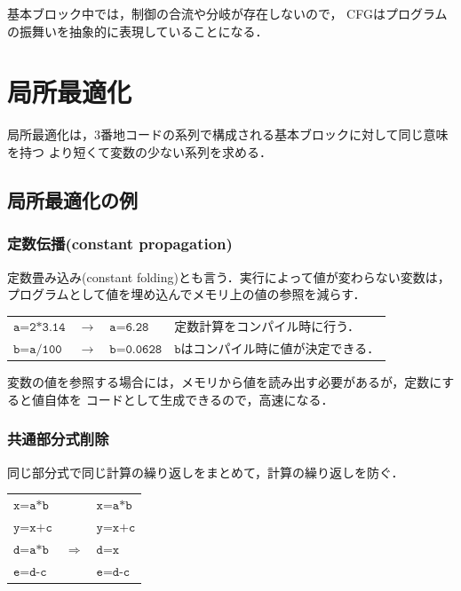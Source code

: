 \documentclass[dvipdfmx,a4j]{jbook}
\begin{document}
基本ブロック中では，制御の合流や分岐が存在しないので，
CFGはプログラムの振舞いを抽象的に表現していることになる．

\section{局所最適化}

局所最適化は，3番地コードの系列で構成される基本ブロックに対して同じ意味を持つ
より短くて変数の少ない系列を求める．

\subsection{局所最適化の例}

\subsubsection{定数伝播(constant propagation)}
定数畳み込み(constant folding)とも言う．実行によって値が変わらない変数は，
プログラムとして値を埋め込んでメモリ上の値の参照を減らす．

\begin{center}
    \begin{tabular}{lclp{6cm}}
        $\texttt{a=2*3.14}$ & $\rightarrow$ & $\texttt{a=6.28}$   & 定数計算をコンパイル時に行う．              \\
        $\texttt{b=a/100}$  & $\rightarrow$ & $\texttt{b=0.0628}$ & $\texttt{b}$はコンパイル時に値が決定できる．
    \end{tabular}
\end{center}

変数の値を参照する場合には，メモリから値を読み出す必要があるが，定数にすると値自体を
コードとして生成できるので，高速になる．

\subsubsection{共通部分式削除}

同じ部分式で同じ計算の繰り返しをまとめて，計算の繰り返しを防ぐ．

\begin{center}
    \begin{tabular}{lcl}
        $\texttt{x=a*b}$ &               & $\texttt{x=a*b}$ \\
        $\texttt{y=x+c}$ &               & $\texttt{y=x+c}$ \\
        $\texttt{d=a*b}$ & $\Rightarrow$ & $\texttt{d=x}$   \\
        $\texttt{e=d-c}$ &               & $\texttt{e=d-c}$
    \end{tabular}
\end{center}
\end{document}
